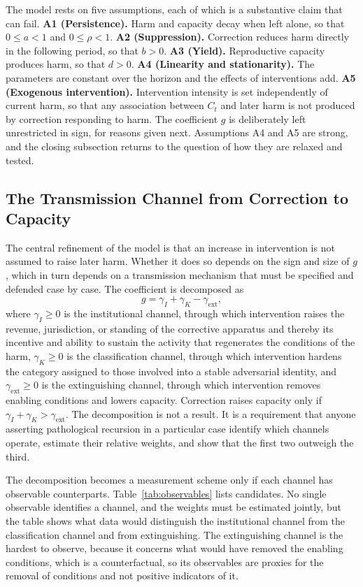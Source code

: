 \documentclass[12pt]{article}
\theoremstyle{remark}
\begin{document}
The model rests on five assumptions, each of which is a substantive claim that can fail. \textbf{A1 (Persistence).} Harm and capacity decay when left alone, so that $0 \le a < 1$ and $0 \le \rho < 1$. \textbf{A2 (Suppression).} Correction reduces harm directly in the following period, so that $b > 0$. \textbf{A3 (Yield).} Reproductive capacity produces harm, so that $d > 0$. \textbf{A4 (Linearity and stationarity).} The parameters are constant over the horizon and the effects of interventions add. \textbf{A5 (Exogenous intervention).} Intervention intensity is set independently of current harm, so that any association between $C_t$ and later harm is not produced by correction responding to harm. The coefficient $g$ is deliberately left unrestricted in sign, for reasons given next. Assumptions A4 and A5 are strong, and the closing subsection returns to the question of how they are relaxed and tested.

\subsection{The Transmission Channel from Correction to Capacity}

The central refinement of the model is that an increase in intervention is not assumed to raise later harm. Whether it does so depends on the sign and size of $g$, which in turn depends on a transmission mechanism that must be specified and defended case by case. The coefficient is decomposed as
\begin{equation}
g = \gamma_I + \gamma_K - \gamma_{\mathrm{ext}} ,
\end{equation}
where $\gamma_I \ge 0$ is the institutional channel, through which intervention raises the revenue, jurisdiction, or standing of the corrective apparatus and thereby its incentive and ability to sustain the activity that regenerates the conditions of the harm, $\gamma_K \ge 0$ is the classification channel, through which intervention hardens the category assigned to those involved into a stable adversarial identity, and $\gamma_{\mathrm{ext}} \ge 0$ is the extinguishing channel, through which intervention removes enabling conditions and lowers capacity. Correction raises capacity only if $\gamma_I + \gamma_K > \gamma_{\mathrm{ext}}$. The decomposition is not a result. It is a requirement that anyone asserting pathological recursion in a particular case identify which channels operate, estimate their relative weights, and show that the first two outweigh the third.

The decomposition becomes a measurement scheme only if each channel has observable counterparts. Table~\ref{tab:observables} lists candidates. No single observable identifies a channel, and the weights must be estimated jointly, but the table shows what data would distinguish the institutional channel from the classification channel and from extinguishing. The extinguishing channel is the hardest to observe, because it concerns what would have removed the enabling conditions, which is a counterfactual, so its observables are proxies for the removal of conditions and not positive indicators of it.
\end{document}
